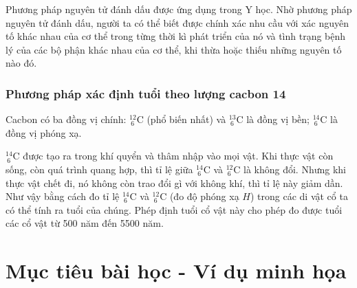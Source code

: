 	Phương pháp nguyên tử đánh dấu được ứng dụng trong Y học. Nhờ phương pháp nguyên tử đánh dấu, người ta có thể biết được chính xác nhu cầu với xác nguyên tố khác nhau của cơ thể trong từng thời kì phát triển của nó và tình trạng bệnh lý của các bộ phận khác nhau của cơ thể, khi thừa hoặc thiếu những nguyên tố nào đó.
	
\subsubsection{Phương pháp xác định tuổi theo lượng cacbon 14}
	 
	 Cacbon có ba đồng vị chính: $^{12}_{\ 6}\text{C}$ (phổ biến nhất) và $^{13}_{\ 6}\text{C}$ là đồng vị bền; $^{14}_{\ 6}\text{C}$ là đồng vị phóng xạ.
	 
	 $^{14}_{\ 6}\text{C}$ được tạo ra trong khí quyển và thâm nhập vào mọi vật. Khi thực vật còn sống, còn quá trình quang hợp, thì tỉ lệ giữa $^{14}_{\ 6}\text{C}$ và $^{12}_{\ 6}\text{C}$ là không đổi. Nhưng khi thực vật chết đi, nó không còn trao đổi gì với không khí, thì tỉ lệ này giảm dần. Như vậy bằng cách đo tỉ lệ $^{14}_{\ 6}\text{C}$ và $^{12}_{\ 6}\text{C}$ (đo độ phóng xạ $H$) trong các di vật cổ ta có thể tính ra tuổi của chúng. Phép định tuổi cổ vật này cho phép đo được tuổi các cổ vật từ 500 năm đến 5500 năm.

\section{Mục tiêu bài học - Ví dụ minh họa}

